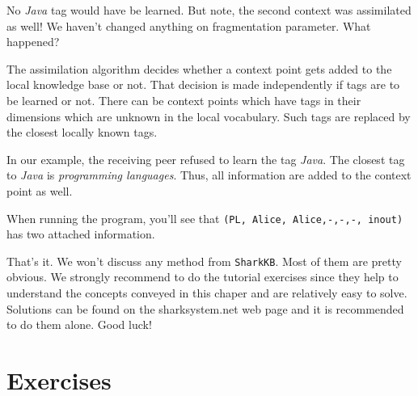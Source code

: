 No {\it Java} tag would have be learned. But note, the second context was assimilated as well! We haven't changed anything on fragmentation parameter. What happened?

The assimilation algorithm decides whether a context point gets added to the local knowledge base or not. That decision is made independently if tags are to be learned or not. There can be context points which have tags in their dimensions which are unknown in the local vocabulary. Such tags are replaced by the closest locally known tags.

In our example, the receiving peer refused to learn the tag {\it Java}. The closest tag to {\it Java} is {\it programming languages}. Thus, all information are added to the context point as well.

When running the program, you'll see that {\tt (PL, Alice, Alice,-,-,-, inout)}
has two attached information.

That's it. We won't discuss any method from {\tt SharkKB}. Most of them are pretty obvious. We strongly recommend to do the tutorial exercises since they help to understand the concepts conveyed in this chaper and are relatively easy to solve. Solutions can be found on the sharksystem.net web page and it is recommended to do them alone. Good luck!

\section{Exercises}
